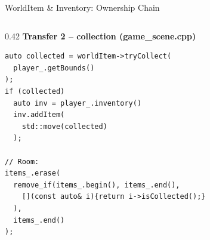 \documentclass[11pt,t,usepdftitle=false,aspectratio=169]{beamer}
\begin{document}
\begin{frame}[fragile,shrink=35]{WorldItem \& Inventory: Ownership Chain}
\begin{columns}[T]
		\begin{column}{0.42\textwidth}
			\small
			\textbf{Transfer 2 -- collection (game\_scene.cpp)}
			\begin{lstlisting}
auto collected = worldItem->tryCollect(
  player_.getBounds()
);
if (collected)
  auto inv = player_.inventory()
  inv.addItem(
    std::move(collected)
  );

// Room:
items_.erase(
  remove_if(items_.begin(), items_.end(),
    [](const auto& i){return i->isCollected();}
  ),
  items_.end()
);
			\end{lstlisting}
		\end{column}

	\end{columns}
\end{frame}


\end{document}
